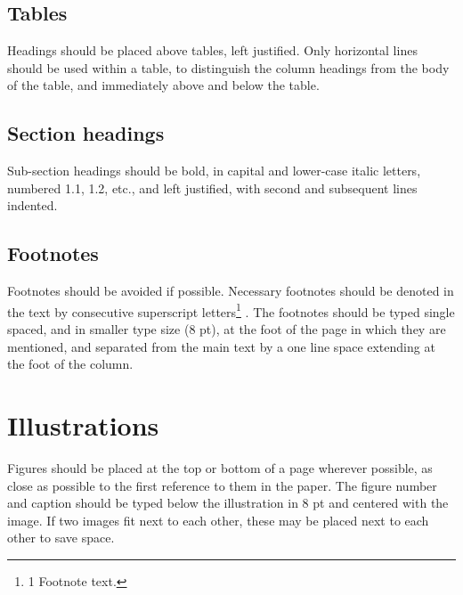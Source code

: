 \documentclass[10pt,twoside]{article}
\begin{document}
\subsection{Tables}
Headings should be placed above tables, left justified. Only horizontal lines should be used within a table, to distinguish the column headings from the body of the table, and immediately above and below the table.

\subsection{Section headings}
Sub-section headings should be bold, in capital and lower-case italic letters, numbered 1.1, 1.2, etc., and left justified, with second and subsequent lines indented. 

\subsection{Footnotes}
Footnotes should be avoided if possible. Necessary footnotes should be denoted in the text by consecutive superscript letters\footnote{1 Footnote text.} \cite{mccabe_system_2023,mccabe_mdocean_2024}. The footnotes should be typed single spaced, and in smaller type size (8 pt), at the foot of the page in which they are mentioned, and separated from the main text by a one line space extending at the foot of the column.

\section{Illustrations}
Figures should be placed at the top or bottom of a page wherever possible, as close as possible to the first reference to them in the paper. The figure number and caption should be typed below the illustration in 8 pt and centered with the image. If two images fit next to each other, these may be placed next to each other to save space.
\end{document}
